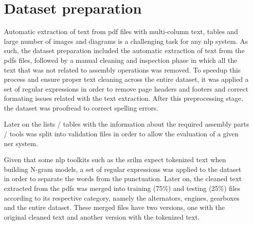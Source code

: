 \section{Dataset preparation}\label{sec:dataset-preparation}

Automatic extraction of text from \gls{pdf} files with multi-column text, tables and large number of images and diagrams is a challenging task for any \gls{nlp} system. As such, the dataset preparation included the automatic extraction of text from the \glspl{pdf} files, followed by a manual cleaning and inspection phase in which all the text that was not related to assembly operations was removed. To speedup this process and ensure proper text cleaning across the entire dataset, it was applied a set of regular expressions in order to remove page headers and footers and correct formating issues related with the text extraction. After this preprocessing stage, the dataset was proofread to correct spelling errors.

Later on the lists / tables with the information about the required assembly parts / tools was split into validation files in order to allow the evaluation of a given \gls{ner} system.

Given that some \gls{nlp} toolkits such as the \gls{srilm} \cite{Stolcke2002} expect tokenized text when building N-gram models, a set of regular expressions was applied to the dataset in order to separate the words from the punctuation. Later on, the cleaned text extracted from the \glspl{pdf} was merged into training (75\%) and testing (25\%) files according to its respective category, namely the alternators, engines, gearboxes and the entire dataset. These merged files have two versions, one with the original cleaned text and another version with the tokenized text.
